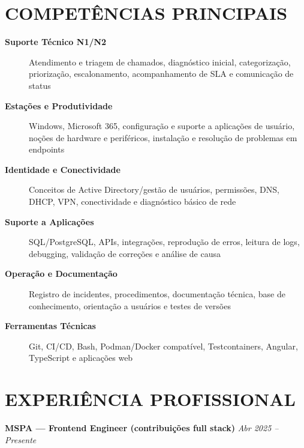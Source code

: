 \documentclass[10pt,a4paper]{article}
\begin{document}

\section*{COMPETÊNCIAS PRINCIPAIS}

\footnotesize

\begin{description}
    \item[\textbf{Suporte Técnico N1/N2}]
    Atendimento e triagem de chamados, diagnóstico inicial, categorização, priorização, escalonamento, acompanhamento de SLA e comunicação de status

    \item[\textbf{Estações e Produtividade}]
    Windows, Microsoft 365, configuração e suporte a aplicações de usuário, noções de hardware e periféricos, instalação e resolução de problemas em endpoints

    \item[\textbf{Identidade e Conectividade}]
    Conceitos de Active Directory/gestão de usuários, permissões, DNS, DHCP, VPN, conectividade e diagnóstico básico de rede

    \item[\textbf{Suporte a Aplicações}]
    SQL/PostgreSQL, APIs, integrações, reprodução de erros, leitura de logs, debugging, validação de correções e análise de causa

    \item[\textbf{Operação e Documentação}]
    Registro de incidentes, procedimentos, documentação técnica, base de conhecimento, orientação a usuários e testes de versões

    \item[\textbf{Ferramentas Técnicas}]
    Git, CI/CD, Bash, Podman/Docker compatível, Testcontainers, Angular, TypeScript e aplicações web
\end{description}


\section*{EXPERIÊNCIA PROFISSIONAL}

\noindent
\textbf{MSPA — Frontend Engineer (contribuições full stack)}
\hfill
\textit{Abr 2025 -- Presente}
\end{document}
